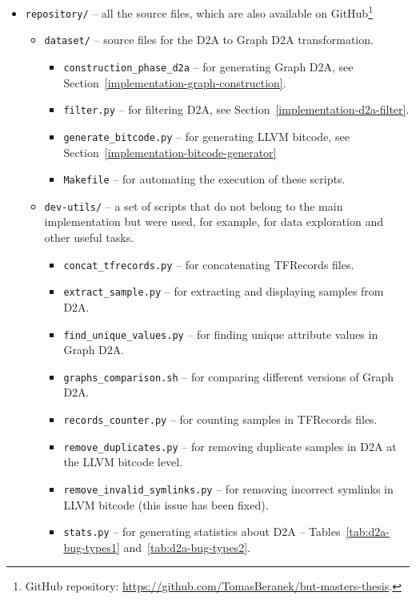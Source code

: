 \begin{itemize}
    \item \texttt{repository/} -- all the source files, which are also available on GitHub\footnote{GitHub repository: \url{https://github.com/TomasBeranek/but-masters-thesis}.}
    \begin{itemize}
        \item \texttt{dataset/} -- source files for the D2A to Graph D2A transformation.
        \begin{itemize}
            \item \texttt{construction\_phase\_d2a} -- for generating Graph D2A, see Section~\ref{implementation-graph-construction}.
            \item \texttt{filter.py} -- for filtering D2A, see Section~\ref{implementation-d2a-filter}.
            \item \texttt{generate\_bitcode.py} -- for generating LLVM bitcode, see Section~\ref{implementation-bitcode-generator}
            \item \texttt{Makefile} -- for automating the execution of these scripts.
        \end{itemize}
        \item \texttt{dev-utils/} -- a set of scripts that do not belong to the main implementation but were used, for example, for data exploration and other useful tasks.
        \begin{itemize}
            \item \texttt{concat\_tfrecords.py} -- for concatenating TFRecords files.
            \item \texttt{extract\_sample.py} -- for extracting and displaying samples from D2A.
            \item \texttt{find\_unique\_values.py} -- for finding unique attribute values in Graph D2A.
            \item \texttt{graphs\_comparison.sh} -- for comparing different  versions of Graph D2A.
            \item \texttt{records\_counter.py} -- for counting samples in TFRecords files.
            \item \texttt{remove\_duplicates.py} -- for removing duplicate samples in D2A at the LLVM bitcode level.
            \item \texttt{remove\_invalid\_symlinks.py} -- for removing incorrect symlinks in LLVM bitcode (this issue has been fixed).
            \item \texttt{stats.py} -- for generating statistics about D2A -- Tables~\ref{tab:d2a-bug-types1} and~\ref{tab:d2a-bug-types2}.

\end{itemize}
\end{itemize}
\end{itemize}
